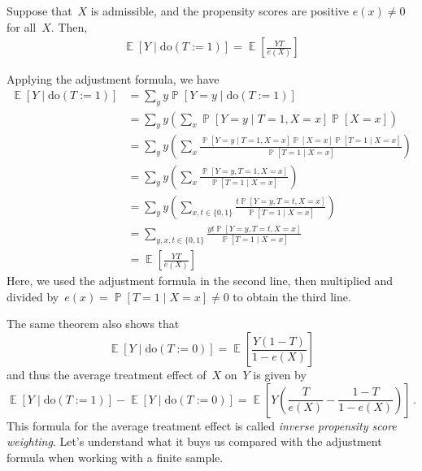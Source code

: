 \documentclass{tufte-book}
\begin{document}
\begin{Theorem}

Suppose that~\(X\) is admissible, and the propensity scores are positive
\(e(x) \neq 0\) for all~\(X\). Then, \[
\begin{aligned}
\mathop\mathbb{E}[ Y \mid \mathrm{do}(T := 1) ] = \mathop\mathbb{E} \left[ \frac{YT}{e(X)} \right]
\end{aligned}
\]

\end{Theorem}

\begin{Proof}

Applying the adjustment formula, we have \[
\begin{aligned}
\mathop\mathbb{E}[ Y \mid \mathrm{do}(T := 1)]
&= \sum_y y \mathop\mathbb{P}[Y = y \mid \mathrm{do}(T := 1)] \\
&= \sum_y y \left( \sum_x \mathop\mathbb{P}[ Y = y \mid T = 1, X=x] \mathop\mathbb{P}[X=x] \right)\\
&= \sum_y y \left( \sum_x \frac{\mathop\mathbb{P}[ Y = y \mid T= 1, X=x] \mathop\mathbb{P}[X=x] \mathop\mathbb{P}[T = 1 \mid X=x]}{\mathop\mathbb{P}[T = 1 \mid X=x]} \right)\\
&= \sum_y y \left( \sum_x \frac{\mathop\mathbb{P}[Y = y, T = 1, X=x]}{\mathop\mathbb{P}[T = 1 \mid X=x]} \right)\\
&= \sum_y y \left( \sum_{x, t\in\{0, 1\}} \frac{t \mathop\mathbb{P}[Y = y,T = t,X=x] }{\mathop\mathbb{P}[T = 1 \mid X=x]} \right)\\
&= \sum_{y, x, t\in\{0, 1\}}   \frac{y t \mathop\mathbb{P}[ Y = y, T = t,  X=x ]}{\mathop\mathbb{P}[T = 1 \mid X=x]} \\
&= \mathop\mathbb{E} \left[ \frac{YT}{e(X)} \right]
\end{aligned}
\] Here, we used the adjustment formula in the second line, then
multiplied and divided
by~\(e(x) = \mathop\mathbb{P}[T = 1 \mid X=x] \neq 0\) to obtain the
third line.

\end{Proof}

The same theorem also shows that \[
\mathop\mathbb{E}[Y \mid \mathrm{do}(T := 0) ] = \mathop\mathbb{E} \left[ \frac{Y(1 - T)}{1 - e(X)} \right]
\] and thus the average treatment effect of~\(X\) on~\(Y\) is given by
\[
\mathop\mathbb{E}[ Y \mid \mathrm{do}(T := 1)]
- \mathop\mathbb{E}[Y \mid \mathrm{do}(T := 0)]
= \mathop\mathbb{E} \left[ Y\left(\frac{T}{e(X)}-\frac{1-T}{1-e(X)}\right) \right]\,.
\] This formula for the average treatment effect is called \emph{inverse
propensity score weighting}. Let's understand what it buys us compared
with the adjustment formula when working with a finite sample.
\end{document}

